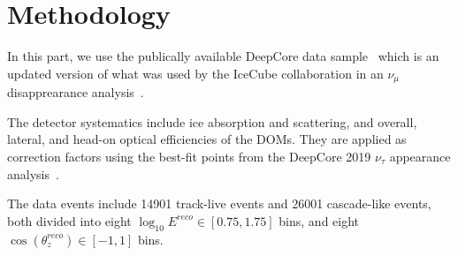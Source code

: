 \documentclass{article}
\newcommand{\zreco}{\ensuremath{\cos{(\theta_z^{reco})}}}
\begin{document}
\section{Methodology}

In this part, we use the publically available DeepCore data sample~\cite{DC2019data} which is an updated version of what was used by the 
IceCube collaboration in an $\nu_\mu$ disapprearance analysis~\cite{DC2018mudisappearance}.

The detector systematics include ice absorption and scattering, and overall, lateral, and head-on optical efficiencies of the DOMs. 
They are applied as correction factors using the best-fit points from the DeepCore 2019 $\nu_\tau$ appearance 
analysis~\cite{DC2019tauappearance}.

The data events include 14901 track-live events and 26001 cascade-like events, both divided into eight 
$ \log_{10}E^{reco} \in [0.75,1.75]$ bins, and eight $\zreco \in [-1,1]$ bins.
\end{document}
